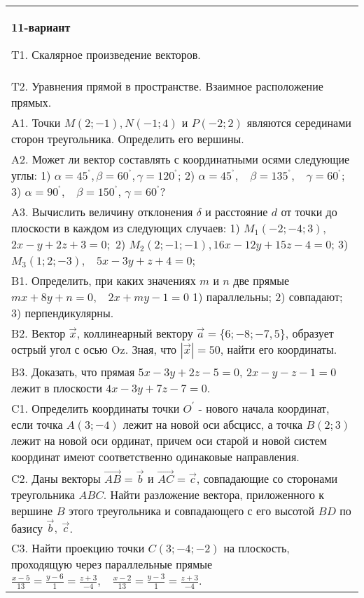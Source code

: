 \documentclass{article}
\begin{document}
\begin{tabular}{m{17cm}}
\textbf{11-вариант}
\newline

T1. 
Скалярное произведение векторов.
 \\
T2. 
Уравнения прямой в пространстве. Взаимное расположение прямых.
 \\
A1. 
Точки \(M(2; - 1),N( - 1;4)\) и \(P( - 2;2)\) являются серединами сторон треугольника. Определить его вершины.
 \\
A2. Может ли вектор составлять с координатными осями следующие углы: 1) \(\alpha = 45^{{^\circ}},\beta = 60^{{^\circ}},\gamma = 120^{{^\circ}}\); 2) \(\alpha = 45^{{^\circ}},\ \ \ \ \beta = 135^{{^\circ}},\ \ \ \ \gamma = 60^{{^\circ}}\); 3) \(\alpha = 90^{{^\circ}},\ \ \ \ \beta = 150^{{^\circ}}\), \(\gamma = 60^{{^\circ}}?\)
 \\
A3. 
Вычислить величину отклонения \(\delta\) и расстояние \(d\) от точки до плоскости в каждом из следующих случаев: 1) \(M_{1}( - 2; - 4;3)\), \(2x - y + 2z + 3 = 0;\) 2) \(M_{2}(2; - 1; - 1),16x - 12y + 15z - 4 = 0\); 3) \(M_{3}(1;2; - 3),\ \ \ \ 5x - 3y + z + 4 = 0\);
 \\
B1. 
Определить, при каких значениях \(m\) и \(n\) две прямые \(mx + 8y + n = 0,\ \ \ \ 2x + my - 1 = 0\) 1) параллельны; 2) совпадают; 3) перпендикулярны.
 \\
B2. 
Вектор \(\overrightarrow{x}\), коллинеарный вектору \(\overrightarrow{a} = \{ 6; - 8; - 7,5\}\), образует острый угол с осью Oz. Зная, что \(|\overrightarrow{x}| = 50\), найти его координаты.
 \\
B3. 
Доказать, что прямая \(5x - 3y + 2z - 5 = 0\), \(2x - y - z - 1 = 0\) лежит в плоскости \(4x - 3y + 7z - 7 = 0\).
 \\
C1. 
Определить координаты точки \(O^{'}\) - нового начала координат, если точка \(A(3; - 4)\) лежит на новой оси абсцисс, а точка \(B(2;3)\) лежит на новой оси ординат, причем оси старой и новой систем координат имеют соответственно одинаковые направления.
 \\
C2. 
Даны векторы \(\overrightarrow{AB} = \overrightarrow{b}\) и \(\overrightarrow{AC} = \overrightarrow{c}\), совпадающие со сторонами треугольника \(ABC\). Найти разложение вектора, приложенного к вершине \(B\) этого треугольника и совпадающего с его высотой \(BD\) по базису \(\overrightarrow{b},\ \overrightarrow{c}\).
 \\
C3. 
Найти проекцию точки \(C(3; - 4; - 2)\) на плоскость, проходящую через параллельные прямые \(\frac{x - 5}{13} = \frac{y - 6}{1} = \frac{z + 3}{- 4},\ \ \ \ \frac{x - 2}{13} = \frac{y - 3}{1} = \frac{z + 3}{- 4}\).
 \\

\end{tabular}
\vspace{1cm}
\end{document}
